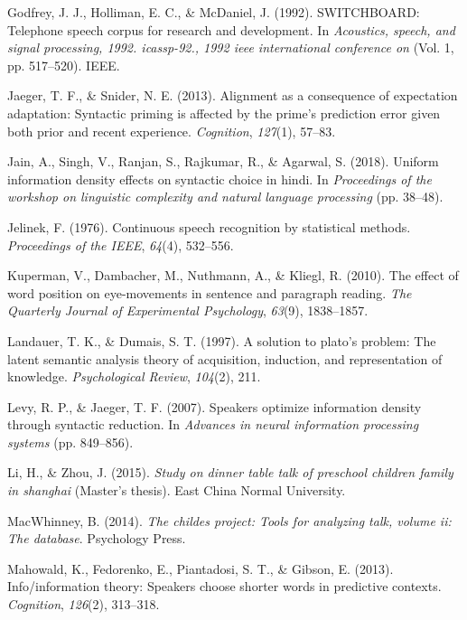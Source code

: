 \documentclass[10pt, letterpaper]{article}
\begin{document}
\hypertarget{ref-godfrey1992}{}
Godfrey, J. J., Holliman, E. C., \& McDaniel, J. (1992). SWITCHBOARD:
Telephone speech corpus for research and development. In
\emph{Acoustics, speech, and signal processing, 1992. icassp-92., 1992
ieee international conference on} (Vol. 1, pp. 517--520). IEEE.

\hypertarget{ref-jaeger2013}{}
Jaeger, T. F., \& Snider, N. E. (2013). Alignment as a consequence of
expectation adaptation: Syntactic priming is affected by the prime's
prediction error given both prior and recent experience.
\emph{Cognition}, \emph{127}(1), 57--83.

\hypertarget{ref-jain2018}{}
Jain, A., Singh, V., Ranjan, S., Rajkumar, R., \& Agarwal, S. (2018).
Uniform information density effects on syntactic choice in hindi. In
\emph{Proceedings of the workshop on linguistic complexity and natural
language processing} (pp. 38--48).

\hypertarget{ref-jelinek1976}{}
Jelinek, F. (1976). Continuous speech recognition by statistical
methods. \emph{Proceedings of the IEEE}, \emph{64}(4), 532--556.

\hypertarget{ref-kuperman2010}{}
Kuperman, V., Dambacher, M., Nuthmann, A., \& Kliegl, R. (2010). The
effect of word position on eye-movements in sentence and paragraph
reading. \emph{The Quarterly Journal of Experimental Psychology},
\emph{63}(9), 1838--1857.

\hypertarget{ref-landauer1997}{}
Landauer, T. K., \& Dumais, S. T. (1997). A solution to plato's problem:
The latent semantic analysis theory of acquisition, induction, and
representation of knowledge. \emph{Psychological Review}, \emph{104}(2),
211.

\hypertarget{ref-levy2007}{}
Levy, R. P., \& Jaeger, T. F. (2007). Speakers optimize information
density through syntactic reduction. In \emph{Advances in neural
information processing systems} (pp. 849--856).

\hypertarget{ref-li2015}{}
Li, H., \& Zhou, J. (2015). \emph{Study on dinner table talk of
preschool children family in shanghai} (Master's thesis). East China
Normal University.

\hypertarget{ref-macwhinney2014}{}
MacWhinney, B. (2014). \emph{The childes project: Tools for analyzing
talk, volume ii: The database}. Psychology Press.

\hypertarget{ref-mahowald2013}{}
Mahowald, K., Fedorenko, E., Piantadosi, S. T., \& Gibson, E. (2013).
Info/information theory: Speakers choose shorter words in predictive
contexts. \emph{Cognition}, \emph{126}(2), 313--318.
\end{document}
